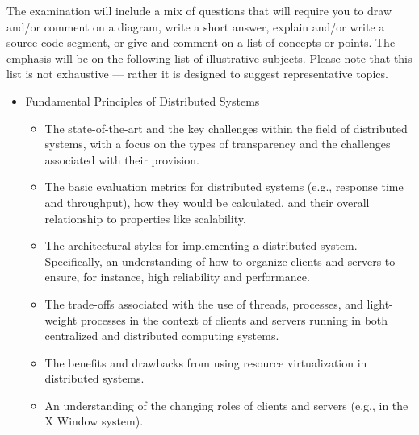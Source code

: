 \vspace*{-.05in}

\noindent The examination will include a mix of questions that will require you to draw and/or comment on a diagram,
write a short answer, explain and/or write a source code segment, or give and comment on a list of concepts or points.
The emphasis will be on the following list of illustrative subjects. Please note that this list is not exhaustive ---
rather it is designed to suggest representative topics.

\vspace*{-.05in}
\begin{itemize}[leftmargin=0.25in]

  \itemsep 0in

  \item Fundamental Principles of Distributed Systems

    \vspace*{-.05in}
    \begin{itemize}[leftmargin=0in]

      \itemsep 0in

      \item The state-of-the-art and the key challenges within the field of distributed systems, with a focus on the types
        of transparency and the challenges associated with their provision.

      \item The basic evaluation metrics for distributed systems (e.g., response time and throughput), how they would be
        calculated, and their overall relationship to properties like scalability.

      \item The architectural styles for implementing a distributed system. Specifically, an understanding of how to
        organize clients and servers to ensure, for instance, high reliability and performance.

      \item The trade-offs associated with the use of threads, processes, and light-weight processes in the context of
        clients and servers running in both centralized and distributed computing systems.

      \item The benefits and drawbacks from using resource virtualization in distributed systems.

      \item An understanding of the changing roles of clients and servers (e.g., in the X Window system).


\end{itemize}
\end{itemize}
